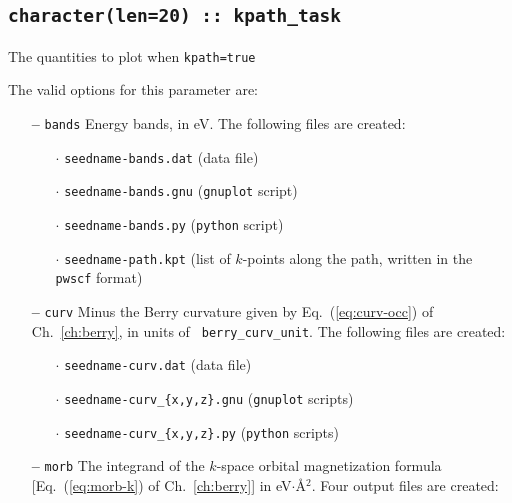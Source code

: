 \subsection[kpath\_task]{\tt character(len=20) ::  kpath\_task} 
The quantities to plot when {\tt kpath=true} 

The valid options for this parameter are:
\begin{itemize}

\item[{\bf --}] \verb#bands# Energy bands, in eV. The following files
  are created:
\begin{itemize}
  
   \item[$\cdot$] {\tt seedname-bands.dat} (data file) 

   \item[$\cdot$] {\tt seedname-bands.gnu} ({\tt gnuplot} script)

   \item[$\cdot$] {\tt seedname-bands.py} ({\tt python} script)

   \item[$\cdot$] {\tt seedname-path.kpt} (list of $k$-points along
     the path, written in the {\tt pwscf} format)

\end{itemize}

\item[{\bf --}] \verb#curv# Minus the Berry curvature given by
  Eq.~(\ref{eq:curv-occ}) of Ch.~\ref{ch:berry}, in units of {\tt
    berry\_curv\_unit}. The following files are created:

\begin{itemize}

   \item[$\cdot$] {\tt seedname-curv.dat} (data file) 

   \item[$\cdot$] {\tt seedname-curv\_\{x,y,z\}.gnu} ({\tt gnuplot} scripts)

   \item[$\cdot$] {\tt seedname-curv\_\{x,y,z\}.py} ({\tt python} scripts)

\end{itemize}

\item[{\bf --}] \verb#morb# The integrand of the $k$-space orbital
  magnetization formula [Eq.~(\ref{eq:morb-k}) of Ch.~\ref{ch:berry}]
  in eV$\cdot$\AA$^2$. Four output files are created:

\begin{itemize}


\end{itemize}
\end{itemize}
